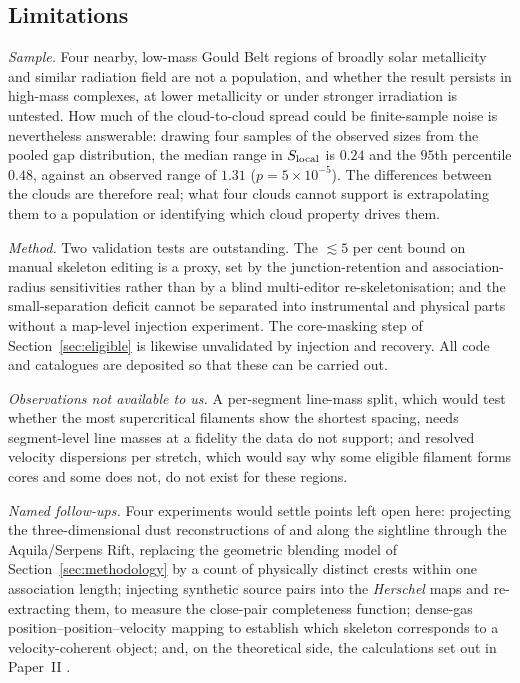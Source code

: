 \documentclass[usenatbib,twoside,twocolumn]{mnras}
\begin{document}
\subsection{Limitations}
\label{sec:limitations}


\emph{Sample.} Four nearby, low-mass Gould Belt regions of broadly solar metallicity and similar radiation field are not a population, and whether the result persists in high-mass complexes, at lower metallicity or under stronger irradiation is untested. How much of the cloud-to-cloud spread could be finite-sample noise is nevertheless answerable: drawing four samples of the observed sizes from the pooled gap distribution, the median range in $S_{\rm local}$ is $0.24$ and the $95$th percentile $0.48$, against an observed range of $1.31$ ($p=5\times10^{-5}$). The differences between the clouds are therefore real; what four clouds cannot support is extrapolating them to a population or identifying which cloud property drives them.

\emph{Method.} Two validation tests are outstanding. The $\lesssim5$ per cent bound on manual skeleton editing is a proxy, set by the junction-retention and association-radius sensitivities rather than by a blind multi-editor re-skeletonisation; and the small-separation deficit cannot be separated into instrumental and physical parts without a map-level injection experiment. The core-masking step of Section~\ref{sec:eligible} is likewise unvalidated by injection and recovery. All code and catalogues are deposited so that these can be carried out.

\emph{Observations not available to us.} A per-segment line-mass split, which would test whether the most supercritical filaments show the shortest spacing, needs segment-level line masses at a fidelity the data do not support; and resolved velocity dispersions per stretch, which would say why some eligible filament forms cores and some does not, do not exist for these regions.

\smallskip\noindent\emph{Named follow-ups.} Four experiments would settle points left open here: projecting the three-dimensional dust reconstructions of \citet{Zucker2020} and \citet{Green2024} along the sightline through the Aquila/Serpens Rift, replacing the geometric blending model of Section~\ref{sec:methodology} by a count of physically distinct crests within one association length; injecting synthetic source pairs into the \textit{Herschel} maps and re-extracting them, to measure the close-pair completeness function; dense-gas position--position--velocity mapping to establish which skeleton corresponds to a velocity-coherent object; and, on the theoretical side, the calculations set out in Paper~II \citep{PaperII}.
\end{document}
